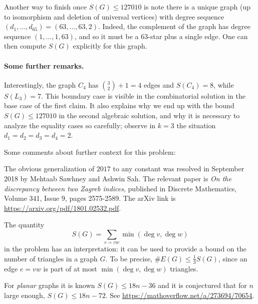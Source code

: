 \begin{remark*}
  Another way to finish once $S(G) \le 127010$
  is note there is a unique graph
  (up to isomorphism and deletion of universal vertices)
  with degree sequence
  $(d_1, \dots, d_{65}) = (63, \dots, 63, 2)$.
  Indeed, the complement of the graph
  has degree sequence $(1, \dots, 1, 63)$,
  and so it must be a $63$-star plus a single edge.
  One can then compute $S(G)$ explicitly for this graph.
\end{remark*}

\paragraph{Some further remarks.}

\begin{remark*}
  Interestingly, the graph $C_4$ has $\binom 32+1 = 4$ edges
  and $S(C_4) = 8$, while $S(L_3) = 7$.
  This boundary case is visible in the combinatorial solution
  in the base case of the first claim.
  It also explains why we end up with the bound $S(G) \le 127010$
  in the second algebraic solution,
  and why it is necessary to analyze the equality cases so carefully;
  observe in $k=3$ the situation $d_1 = d_2 = d_3 = d_4 = 2$.
\end{remark*}

\begin{remark*}
  Some comments about further context for this problem:
  \begin{itemize}
  \ii The obvious generalization of $2017$ to any constant
  was resolved in September 2018 by Mehtaab Sawhney and Ashwin Sah.
  The relevant paper is
  \emph{On the discrepancy between two Zagreb indices},
  published in Discrete Mathematics, Volume 341, Issue 9, pages 2575-2589.
  The arXiv link is \url{https://arxiv.org/pdf/1801.02532.pdf}.

  \ii The quantity
  \[ S(G) = \sum_{e = vw} \min \left( \deg v, \deg w \right) \]
  in the problem has an interpretation:
  it can be used to provide a bound on the
  number of triangles in a graph $G$.
  To be precise, $\# E(G) \le \frac 13 S(G)$,
  since an edge $e = vw$ is part of at most $\min(\deg v, \deg w)$ triangles.

  \ii For \emph{planar} graphs it is known $S(G) \le 18n-36$
  and it is conjectured that for $n$ large enough, $S(G) \le 18n-72$.
  See \url{https://mathoverflow.net/a/273694/70654}.
  \end{itemize}
\end{remark*}


